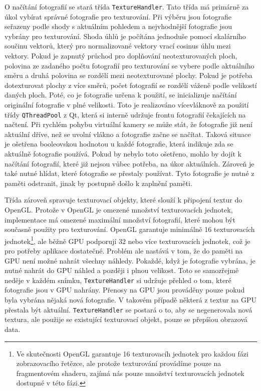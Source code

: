 \documentclass[11pt,twoside,a4paper]{book}
\begin{document}
O načítání fotografií se stará třída \texttt{TextureHandler}. Tato třída má primárně za úkol vybírat správné fotografie pro texturování. Při výběru jsou fotografie seřazeny podle shody s aktuálním pohledem a  nejvhodnější fotografie jsou vybrány pro texturování. Shoda úhlů je počítána jednoduše pomocí skalárního součinu vektorů, který pro normalizované vektory vrací cosinus úhlu mezi vektory. Pokud je zapnutý průchod pro doplňování neotexturovaných ploch, polovina ze zadaného počtu fotografií pro texturování se vybere podle aktuálního směru a druhá polovina se rozdělí mezi neotexturované plochy. Pokud je potřeba dotexturovat plochy z více směrů, počet fotografií se rozdělí váženě podle velikostí daných ploch. Poté, co je fotografie určena k použití, se inicializuje načítání originální fotografie v plné velikosti. Toto je realizováno vícevláknově za použití třídy \texttt{QThreadPool} z Qt, která si interně udržuje frontu fotografií čekajících na načtení.  Při rychlém pohybu virtuální kamery se může stát, že fotografie již není aktuální dříve, než se uvolní vlákno a fotografie začne se načítat. Taková situace je ošetřena booleovskou hodnotou u každé fotografie, která indikuje zda se aktuálně fotografie používá. Pokud by nebylo toto ošetřeno, mohlo by dojít k načítání fotografií, které již nejsou vůbec potřeba, na úkor aktuálních. Zároveň je také nutné hlídat, které fotografie se přestaly používat. Tyto fotografie je nutné z paměti odstranit, jinak by postupně došlo k zaplnění paměti.

Třída zároveň spravuje texturovací objekty, které slouží k připojení textur do OpenGL. Protože v OpenGL je omezené množství texturovacích jednotek, implementace má omezené maximální množství fotografií, které mohou být současně použity pro texturování. OpenGL garantuje minimálně 16 texturovacích jednotek\footnote{Ve skutečnosti OpenGL garantuje 16 texturovacíh jednotek pro každou fázi zobrazovacího řetězce, ale protože texturování provádíme pouze na fragmentovém shaderu, zajímá nás pouze množství texturovacích jednotek dostupné v této fázi.}, ale běžně GPU podporují 32 nebo více texturovacích jednotek, což je pro potřeby aplikace dostatečné. Problém ale nastává v tom, že do paměti na GPU není možné nahrát všechny náhledy. Pokaždé, když je fotografie vybrána, je nutné nahrát do GPU náhled a později i plnou velikost. Toto se samozřejmě neděje v každém snímku, \texttt{TextureHandler} si udržuje přehled o tom, které fotografie jsou v GPU nahrány. Přenosy na GPU jsou prováděny pouze pokud byla vybrána nějaká nová fotografie. V takovém případě některá z textur na GPU přestala být aktuální.  \texttt{TextureHandler} se postará o to, aby se negenerovala nová textura, ale použije se existující texturovací objekt, pouze se přepíšou obrazová data. 
\end{document}
